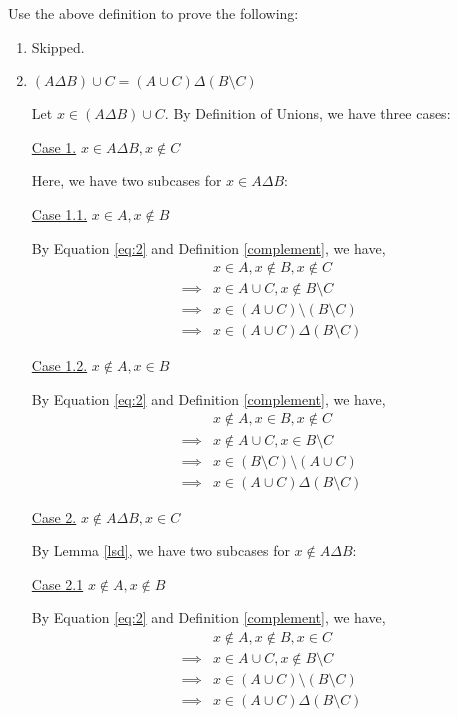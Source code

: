 \bp Use the above definition to prove the following:
\begin{enumerate}
	\item Skipped.

	\item $(A \Delta B) \cup C = (A \cup C) \Delta (B \setminus C)$

	      \bs
	      \begin{named}[Part 1]
		      Let $x \in (A \Delta B) \cup C$. By Definition of Unions, we have three cases:

		      \underline{Case 1.} $x \in A \Delta B, x \not\in C$

		      Here, we have two subcases for $x \in A \Delta B$:

		      \underline{Case 1.1.} $x \in A, x \not\in B$

		      By Equation \ref{eq:2} and Definition \ref{complement}, we have,
		      \begin{align*}
			               & x \in A, x \not\in B, x \not\in C          \\
			      \implies & x \in A \cup C, x \not\in B \setminus C    \\
			      \implies & x \in (A \cup C) \setminus (B \setminus C) \\
			      \implies & x \in (A \cup C) \Delta (B \setminus C)
		      \end{align*}

		      \underline{Case 1.2.} $x \not\in A, x \in B$

		      By Equation \ref{eq:2} and Definition \ref{complement}, we have,
		      \begin{align*}
			               & x \not\in A, x \in B, x \not\in C          \\
			      \implies & x \not\in A \cup C, x \in B \setminus C    \\
			      \implies & x \in (B \setminus C) \setminus (A \cup C) \\
			      \implies & x \in (A \cup C) \Delta (B \setminus C)
		      \end{align*}


		      \underline{Case 2.} $x \not\in A \Delta B, x \in C$

		      By Lemma \ref{lsd}, we have two subcases for $x \not\in A \Delta B$:

		      \underline{Case 2.1} $x \not\in A, x \not\in B$

		      By Equation \ref{eq:2} and Definition \ref{complement}, we have,
		      \begin{align*}
			               & x \not\in A, x \not\in B, x \in C          \\
			      \implies & x \in A \cup C, x \not\in B \setminus C    \\
			      \implies & x \in (A \cup C) \setminus (B \setminus C) \\
			      \implies & x \in (A \cup C) \Delta (B \setminus C)
		      \end{align*}


\end{named}
\end{enumerate}
